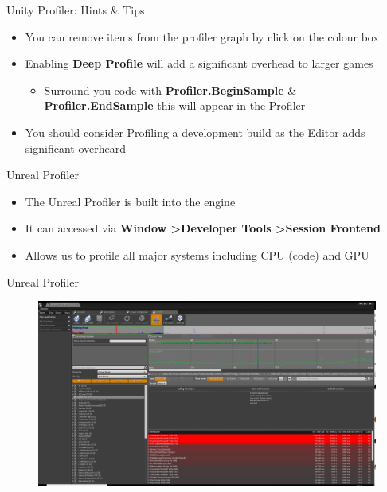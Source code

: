 \begin{frame}{Unity Profiler: Hints \& Tips}
	\begin{itemize}
		\pause \item You can remove items from the profiler graph by click on the colour box
		\pause \item Enabling \textbf{Deep Profile} will add a significant overhead to larger games
		\begin{itemize}
			\pause \item Surround you code with \textbf{Profiler.BeginSample} \& \textbf{Profiler.EndSample} this will appear in the Profiler
		\end{itemize}
		\pause \item You should consider Profiling a development build as the Editor adds significant overheard
	\end{itemize}
\end{frame}

\begin{frame}{Unreal Profiler}
	\begin{itemize}
		\pause \item The Unreal Profiler is built into the engine
		\pause \item It can accessed via \textbf{Window \textgreater  Developer Tools \textgreater  Session Frontend}
		\pause \item Allows us to profile all major systems including CPU (code) and GPU
	\end{itemize}
\end{frame}

\begin{frame}{Unreal Profiler}
	\begin{figure}
		\includegraphics[width=1.0\textwidth,height=0.8\textheight]{UnrealProfilerWindow}  
	\end{figure}
\end{frame}

